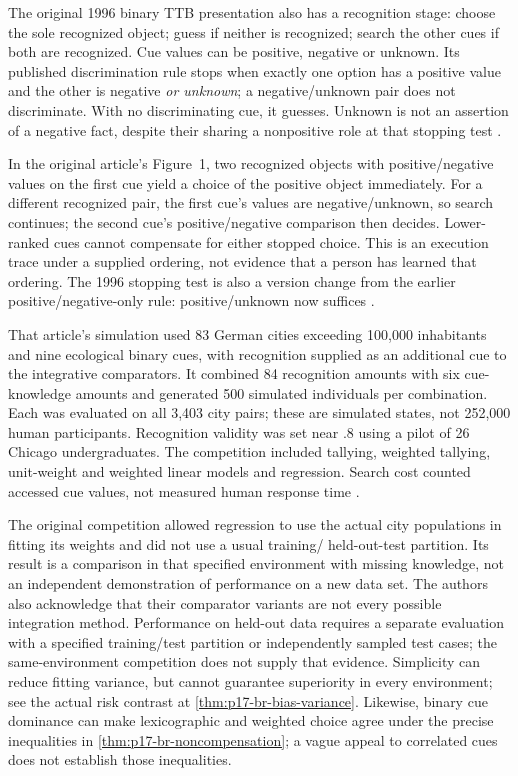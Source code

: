 The original 1996 binary TTB presentation also has a recognition
stage: choose the sole recognized object; guess if neither is
recognized; search the other cues if both are recognized. Cue values
can be positive, negative or unknown. Its published discrimination
rule stops when exactly one option has a positive value and the
other is negative \emph{or unknown}; a negative/unknown pair does
not discriminate. With no discriminating cue, it guesses. Unknown
is not an assertion of a negative fact, despite their sharing a
nonpositive role at that stopping test
\cite[pp.~652--654]{GigerenzerGoldstein1996FastFrugal}.

In the original article's Figure~1, two recognized objects with
positive/negative values on the first cue yield a choice of the
positive object immediately. For a different recognized pair, the
first cue's values are negative/unknown, so search continues; the
second cue's positive/negative comparison then decides. Lower-ranked
cues cannot compensate for either stopped choice. This is an execution
trace under a supplied ordering, not evidence that a person has learned
that ordering. The 1996 stopping test is also a version change from
the earlier positive/negative-only rule: positive/unknown now suffices
\cite[pp.~652--654, Figures~1--3]{GigerenzerGoldstein1996FastFrugal}.

That article's simulation used 83 German cities exceeding 100,000
inhabitants and nine ecological binary cues, with recognition supplied
as an additional cue to the integrative comparators. It combined
84 recognition amounts with six cue-knowledge amounts and generated
500 simulated individuals per combination. Each was evaluated on
all 3,403 city pairs; these are simulated states, not 252,000 human
participants. Recognition validity was set near .8 using a pilot
of 26 Chicago undergraduates. The competition included tallying,
weighted tallying, unit-weight and weighted linear models and
regression. Search cost counted accessed cue values, not measured
human response time \cite[pp.~654--658]{GigerenzerGoldstein1996FastFrugal}.

The original competition allowed regression to use the actual city
populations in fitting its weights and did not use a usual training/
held-out-test partition. Its result is a comparison in that specified
environment with missing knowledge, not an independent demonstration
of performance on a new data set. The authors also acknowledge that
their comparator variants are not every possible integration method.
Performance on held-out data requires a separate evaluation with a
specified training/test partition or independently sampled test cases;
the same-environment competition does not supply that evidence.
Simplicity can reduce fitting variance, but cannot guarantee superiority
in every environment; see the actual risk contrast at
\cref{thm:p17-br-bias-variance}. Likewise, binary cue dominance can
make lexicographic and weighted choice agree under the precise
inequalities in \cref{thm:p17-br-noncompensation}; a vague appeal
to correlated cues does not establish those inequalities.

